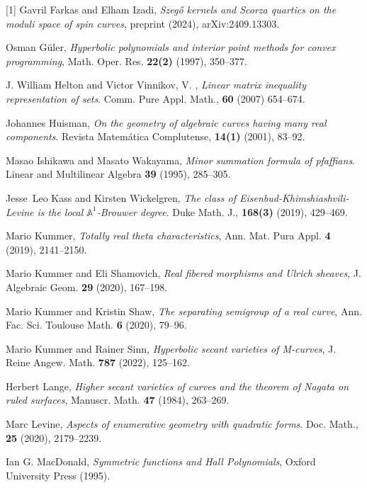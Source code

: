 \documentclass[12pt]{amsart}
\numberwithin{equation}{section}
\numberwithin{thmcounter}{section}
\theoremstyle{definition}
\theoremstyle{claim}
\begin{document}
\begin{thebibliography}{[1]}
   Gavril Farkas  and Elham Izadi, \textit{Szeg\H{o} kernels and Scorza quartics on the moduli space of spin curves}, preprint (2024), arXiv:2409.13303.

    Osman G\"uler, \textit{Hyperbolic polynomials and interior point methods for convex programming}, Math. Oper. Res. \textbf{22(2)} (1997), 350--377.
    
J. William Helton and Victor Vinnikov, V. , \textit{Linear matrix inequality representation of sets}. Comm. Pure Appl. Math., \textbf{60} (2007) 654--674.


Johannes Huisman,
\textit{On the geometry of algebraic curves having many real components}.
Revista Matem\'atica Complutense, \textbf{14(1)} (2001), 83--92.


    Masao Ishikawa and Masato Wakayama, \textit{Minor summation formula of pfaffians}. Linear and Multilinear Algebra \textbf{39} (1995), 285--305.

Jesse~Leo Kass and Kirsten Wickelgren,
\textit{The class of {Eisenbud}-{Khimshiashvili}-{Levine} is the local
  {{\(\mathbb{A}^1\)}}-{Brouwer} degree}.
{Duke Math. J.}, \textbf{168(3)} (2019), 429--469.

Mario Kummer, \textit{Totally real theta characteristics}, Ann. Mat. Pura Appl. \textbf{4} (2019), 2141--2150.

    Mario Kummer and Eli Shamovich, \textit{Real fibered morphisms and Ulrich sheaves}, J. Algebraic Geom. \textbf{29} (2020), 167--198.

Mario Kummer and Kristin Shaw, \textit{The separating semigroup of a real curve}, Ann. Fac. Sci. Toulouse Math. \textbf{6} (2020), 79--96.

    Mario Kummer and Rainer Sinn, \textit{Hyperbolic secant varieties of M-curves}, J. Reine Angew. Math. \textbf{787} (2022), 125--162.

    Herbert Lange, \textit{Higher secant varieties of curves and the theorem of Nagata on ruled surfaces},  Manuscr. Math. \textbf{47} (1984), 263--269.

Marc Levine,
\textit{Aspects of enumerative geometry with quadratic forms}.
 {Doc. Math.}, \textbf{25} (2020), 2179--2239.

Ian G. MacDonald, \textit{Symmetric functions and Hall Polynomials}, Oxford University Press (1995).


\end{thebibliography}
\end{document}
